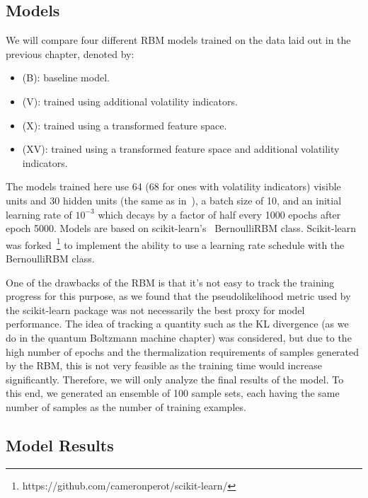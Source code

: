 \subsection{Models}
We will compare four different RBM models trained on the data laid out in the previous chapter, denoted by:
\begin{itemize}
    \item (B): baseline model.
    \item (V): trained using additional volatility indicators.
    \item (X): trained using a transformed feature space.
    \item (XV): trained using a transformed feature space and additional volatility indicators.
\end{itemize}
The models trained here use 64 (68 for ones with volatility indicators) visible units and 30 hidden units (the same as in~\cite{kondratyev_2019}), a batch size of 10, and an initial learning rate of \( 10^{-3} \) which decays by a factor of half every 1000 epochs after epoch 5000.
Models are based on scikit-learn's~\cite{python_sklearn} BernoulliRBM class.
Scikit-learn was forked~\footnote{https://github.com/cameronperot/scikit-learn/} to implement the ability to use a learning rate schedule with the BernoulliRBM class.

One of the drawbacks of the RBM is that it's not easy to track the training progress for this purpose, as we found that the pseudolikelihood metric used by the scikit-learn package was not necessarily the best proxy for model performance.
The idea of tracking a quantity such as the KL divergence (as we do in the quantum Boltzmann machine chapter) was considered, but due to the high number of epochs and the thermalization requirements of samples generated by the RBM, this is not very feasible as the training time would increase significantly.
Therefore, we will only analyze the final results of the model.
To this end, we generated an ensemble of 100 sample sets, each having the same number of samples as the number of training examples.

\subsection{Model Results}
